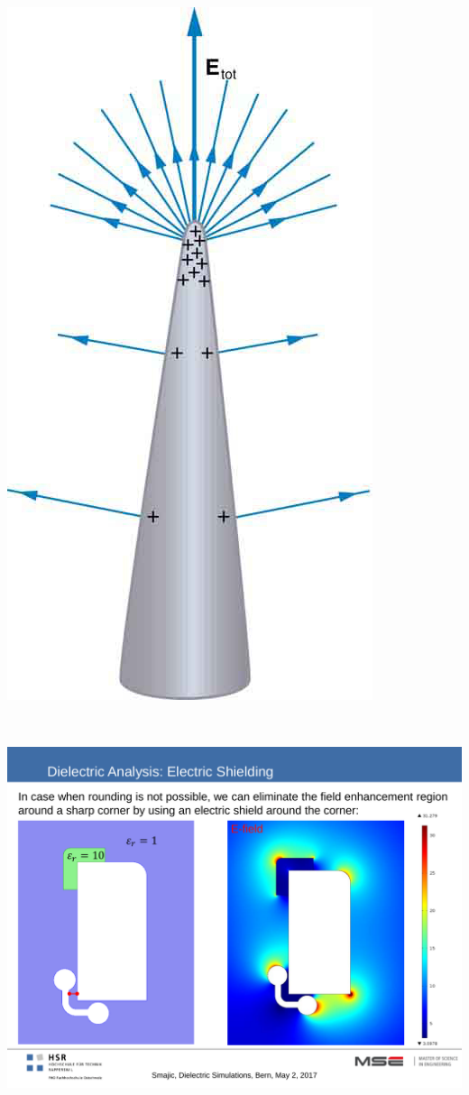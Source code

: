 \begin{minipage}[rt]{4cm}
	\includegraphics[width=.7\textwidth]{./images/fieldEnhancement.jpeg}
\end{minipage}
\\
\begin{minipage}{5cm}
	\includegraphics[width=.8\textwidth]{./images/EFields.pdf}
\end{minipage}
